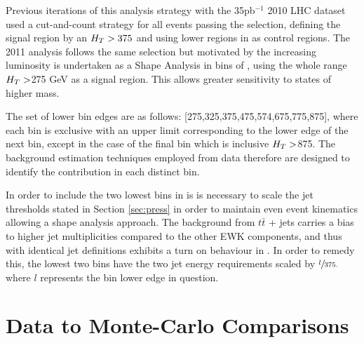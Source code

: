 Previous iterations of this analysis strategy with the 35pb$^{-1}$ 2010 LHC dataset \cite{35paper} used a cut-and-count strategy for all events passing the selection, defining the signal region by an $H_{T}  > 375$ and using lower regions in \HT as control regions. The 2011 analysis follows the same selection but motivated by the increasing luminosity is undertaken as a Shape Analysis in bins of \HT, using the whole range $H_{T}  > $275 GeV as a signal region. This allows greater sensitivity to states of higher mass. 

The set of lower bin edges are as follows: [275,325,375,475,574,675,775,875], where each bin is exclusive with an upper limit corresponding to the lower edge of the next bin, except in the case of the final bin which is inclusive $H_{T}  > $875. The background estimation techniques employed from data therefore are designed to identify the contribution in each distinct bin. 

In order to include the two lowest bins in \HT is is necessary to scale the jet thresholds stated in Section \ref{sec:press} in order to maintain even event kinematics allowing a shape analysis approach. The background from $t\bar{t}$ + jets carries a bias to higher jet multiplicities compared to the other EWK components, and thus with identical jet definitions exhibits a turn on behaviour in \HT. In order to remedy this, the lowest two bins have the two jet energy requirements scaled by $\sfrac{l}{375.}$ where $l$ represents the bin lower edge in question.


\section{Data to Monte-Carlo Comparisons }




